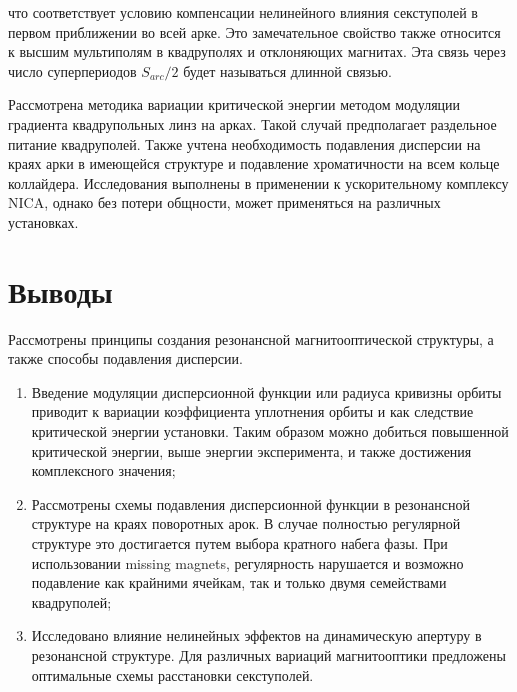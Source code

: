 \noindent что соответствует условию компенсации нелинейного влияния секступолей в первом приближении во всей арке. Это замечательное свойство также относится к высшим мультиполям в квадруполях и отклоняющих магнитах. Эта связь через число суперпериодов $S_{arc}/2$ будет называться длинной связью.

\par Рассмотрена методика вариации критической энергии методом модуляции градиента квадрупольных линз на арках. Такой случай предполагает раздельное питание квадруполей. Также учтена необходимость подавления дисперсии на краях арки в имеющейся структуре и подавление хроматичности на всем кольце коллайдера. Исследования выполнены в применении к ускорительному комплексу NICA, однако без потери общности, может применяться на различных установках.


\section*{Выводы}
\par Рассмотрены принципы создания резонансной магнитооптической структуры, а также способы подавления дисперсии.

\begin{enumerate}

\item Введение модуляции дисперсионной функции или радиуса кривизны орбиты приводит к вариации коэффициента уплотнения орбиты и как следствие критической энергии установки. Таким образом можно добиться повышенной критической энергии, выше энергии эксперимента, и также достижения комплексного значения;

\item Рассмотрены схемы подавления дисперсионной функции в резонансной структуре на краях поворотных арок. В случае полностью регулярной структуре это достигается путем выбора кратного набега фазы. При использовании missing magnets, регулярность нарушается и возможно подавление как крайними ячейкам, так и только двумя семействами квадруполей;

\item Исследовано влияние нелинейных эффектов на динамическую апертуру в резонансной структуре. Для различных вариаций магнитооптики предложены оптимальные схемы расстановки секступолей.

\end{enumerate}

\FloatBarrier